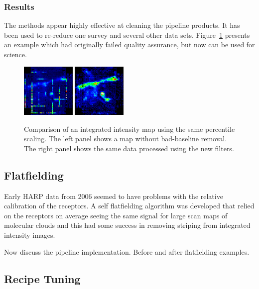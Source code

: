 \documentclass[final,authoryear,5p,times,twocolumn]{elsarticle}
\begin{document}
\subsubsection{Results}

The methods appear highly effective at cleaning the pipeline
products. It has been used to re-reduce one survey and several other
data sets. Figure~\ref{fig:badbase:results} presents an example which
had originally failed quality assurance, but now can be used for
science.

\begin{figure}
\includegraphics[width=0.23\textwidth]{P61_f3a}
\includegraphics[width=0.23\textwidth]{P61_f3b}
\caption{Comparison of an integrated intensity map using the same
  percentile scaling.  The left panel shows a map without bad-baseline
  removal.  The right panel shows the same data processed using the
  new filters.}
\label{fig:badbase:results}
\end{figure}

\subsection{Flatfielding}

Early HARP data from 2006 seemed to have problems with the relative
calibration of the receptors. A self flatfielding algorithm was
developed that relied on the receptors on average seeing the same
signal for large scan maps of molecular clouds
\citep{2010MNRAS.401..455C} and this had some success in removing
striping from integrated intensity images.

{\color{red} Now discuss the pipeline implementation. Before and after flatfielding examples.}

\subsection{Recipe Tuning}
\end{document}
